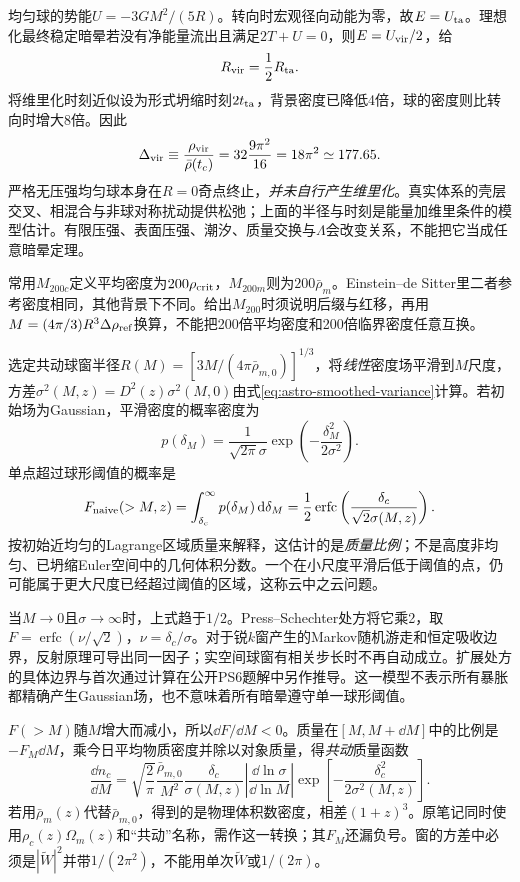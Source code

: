 均匀球的势能$U=-3GM^2/(5R)$。转向时宏观径向动能为零，故$E=U_{\rm ta}$。理想化最终稳定暗晕若没有净能量流出且满足$2T+U=0$，则$E=U_{\rm vir}/2$，给
\[
 R_{\rm vir}=\frac12R_{\rm ta}.
\]
将维里化时刻近似设为形式坍缩时刻$2t_{\rm ta}$，背景密度已降低4倍，球的密度则比转向时增大8倍。因此
\[
 \Delta_{\rm vir}\equiv\frac{\rho_{\rm vir}}{\bar\rho(t_c)}
 =32\frac{9\pi^2}{16}=18\pi^2\simeq177.65.
\]
严格无压强均匀球本身在$R=0$奇点终止，\emph{并未自行产生维里化}。真实体系的壳层交叉、相混合与非球对称扰动提供松弛；上面的半径与时刻是能量加维里条件的模型估计。有限压强、表面压强、潮汐、质量交换与$\Lambda$会改变关系，不能把它当成任意暗晕定理。

常用$M_{200c}$定义平均密度为$200\rho_{\rm crit}$，$M_{200m}$则为$200\bar\rho_m$。Einstein--de Sitter里二者参考密度相同，其他背景下不同。给出$M_{200}$时须说明后缀与红移，再用$M=(4\pi/3)R^3\Delta\rho_{\rm ref}$换算，不能把200倍平均密度和200倍临界密度任意互换。

选定共动球窗半径$R(M)=[3M/(4\pi\bar\rho_{m,0})]^{1/3}$，将\emph{线性}密度场平滑到$M$尺度，方差$\sigma^2(M,z)=D^2(z)\sigma^2(M,0)$由式\eqref{eq:astro-smoothed-variance}计算。若初始场为Gaussian，平滑密度的概率密度为
\[
 p(\delta_M)=\frac1{\sqrt{2\pi}\sigma}\exp\left(-\frac{\delta_M^2}{2\sigma^2}\right).
\]
单点超过球形阈值的概率是
\[
 F_{\rm naive}(>M,z)=\int_{\delta_c}^{\infty}p(\delta_M)\,\mathrm d\delta_M
 =\frac12\operatorname{erfc}\left(\frac{\delta_c}{\sqrt2\sigma(M,z)}\right).
\]
按初始近均匀的Lagrange区域质量来解释，这估计的是\emph{质量比例}；不是高度非均匀、已坍缩Euler空间中的几何体积分数。一个在小尺度平滑后低于阈值的点，仍可能属于更大尺度已经超过阈值的区域，这称云中之云问题。

当$M\to0$且$\sigma\to\infty$时，上式趋于$1/2$。Press--Schechter处方将它乘2，取$F=\operatorname{erfc}(\nu/\sqrt2)$，$\nu=\delta_c/\sigma$。对于锐$k$窗产生的Markov随机游走和恒定吸收边界，反射原理可导出同一因子；实空间球窗有相关步长时不再自动成立。扩展处方的具体边界与首次通过计算在公开PS6题解中另作推导。这一模型不表示所有暴胀都精确产生Gaussian场，也不意味着所有暗晕遵守单一球形阈值。

$F(>M)$随$M$增大而减小，所以$\dd F/\dd M<0$。质量在$[M,M+\dd M]$中的比例是$-F_M\dd M$，乘今日平均物质密度并除以对象质量，得\emph{共动}质量函数
\begin{equation}\label{eq:astro-press-schechter}
 \frac{\dd n_c}{\dd M}=\sqrt{\frac2\pi}\frac{\bar\rho_{m,0}}{M^2}
 \frac{\delta_c}{\sigma(M,z)}\left|\frac{\dd\ln\sigma}{\dd\ln M}\right|
 \exp\left[-\frac{\delta_c^2}{2\sigma^2(M,z)}\right].
\end{equation}
若用$\bar\rho_m(z)$代替$\bar\rho_{m,0}$，得到的是物理体积数密度，相差$(1+z)^3$。原笔记同时使用$\rho_c(z)\Omega_m(z)$和“共动”名称，需作这一转换；其$F_M$还漏负号。窗的方差中必须是$|\widetilde W|^2$并带$1/(2\pi^2)$，不能用单次$\widetilde W$或$1/(2\pi)$。

